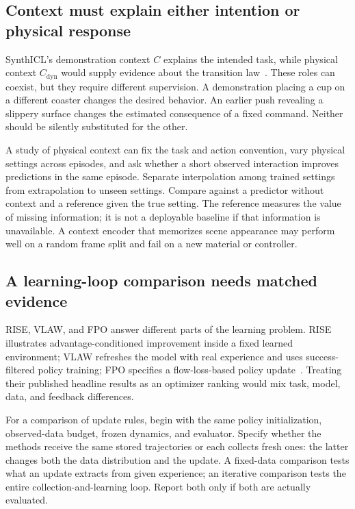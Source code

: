 \subsection{Context must explain either intention or physical response}
SynthICL's demonstration context $C$ explains the intended task, while physical context $C_{\mathrm{dyn}}$ would supply evidence about the transition law~\citep{synthicl}. These roles can coexist, but they require different supervision. A demonstration placing a cup on a different coaster changes the desired behavior. An earlier push revealing a slippery surface changes the estimated consequence of a fixed command. Neither should be silently substituted for the other.

A study of physical context can fix the task and action convention, vary physical settings across episodes, and ask whether a short observed interaction improves predictions in the same episode. Separate interpolation among trained settings from extrapolation to unseen settings. Compare against a predictor without context and a reference given the true setting. The reference measures the value of missing information; it is not a deployable baseline if that information is unavailable. A context encoder that memorizes scene appearance may perform well on a random frame split and fail on a new material or controller.

\subsection{A learning-loop comparison needs matched evidence}
RISE, VLAW, and FPO answer different parts of the learning problem. RISE illustrates advantage-conditioned improvement inside a fixed learned environment; VLAW refreshes the model with real experience and uses success-filtered policy training; FPO specifies a flow-loss-based policy update~\citep{rise,vlaw,fpo}. Treating their published headline results as an optimizer ranking would mix task, model, data, and feedback differences.

For a comparison of update rules, begin with the same policy initialization, observed-data budget, frozen dynamics, and evaluator. Specify whether the methods receive the same stored trajectories or each collects fresh ones: the latter changes both the data distribution and the update. A fixed-data comparison tests what an update extracts from given experience; an iterative comparison tests the entire collection-and-learning loop. Report both only if both are actually evaluated.

